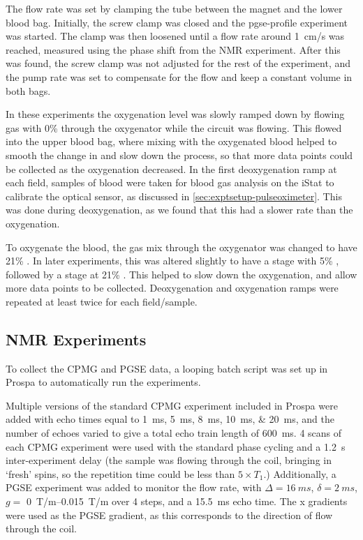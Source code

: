 The flow rate was set by clamping the tube between the magnet and the lower blood bag.
Initially, the screw clamp was closed and the pgse-profile experiment was started.
The clamp was then loosened until a flow rate around \SI{1}{cm/s} was reached, measured using the phase shift from the NMR experiment.
After this was found, the screw clamp was not adjusted for the rest of the experiment, and the pump rate was set to compensate for the flow and keep a constant volume in both bags.

In these experiments the oxygenation level was slowly ramped down by flowing gas with 0\% \Otwo through the oxygenator while the circuit was flowing.
This flowed into the upper blood bag, where mixing with the oxygenated blood helped to smooth the change in \SOtwo and slow down the process, so that more data points could be collected as the oxygenation decreased.
In the first deoxygenation ramp at each field, samples of blood were taken for blood gas analysis on the iStat to calibrate the optical sensor, as discussed in \autoref{sec:exptsetup-pulseoximeter}.
This was done during deoxygenation, as we found that this had a slower rate than the oxygenation.

To oxygenate the blood, the gas mix through the oxygenator was changed to have 21\% \Otwo.
In later experiments, this was altered slightly to have a stage with 5\% \Otwo, followed by a stage at 21\% \Otwo.
This helped to slow down the oxygenation, and allow more data points to be collected.
Deoxygenation and oxygenation ramps were repeated at least twice for each field/sample.

\subsection{NMR Experiments}
To collect the CPMG and PGSE data, a looping batch script was set up in Prospa to automatically run the experiments.

Multiple versions of the standard CPMG experiment included in Prospa were added with echo times equal to \SIlist{1;5;8;10;20}{ms}, and the number of echoes varied to give a total echo train length of \SI{600}{ms}.
4 scans of each CPMG experiment were used with the standard phase cycling and a \SI{1.2}{s} inter-experiment delay (the sample was flowing through the coil, bringing in `fresh' spins, so the repetition time could be less than $5 \times \mathit{T_1}$.)
Additionally, a PGSE experiment was added to monitor the flow rate, with $\Delta = \SI{16}{ms}$, $\delta = \SI{2}{ms}$, $\mathit{g} =$ \SIrange{0}{0.015}{T/m} over 4 steps, and a \SI{15.5}{ms} echo time.
The x gradients were used as the PGSE gradient, as this corresponds to the direction of flow through the coil.

